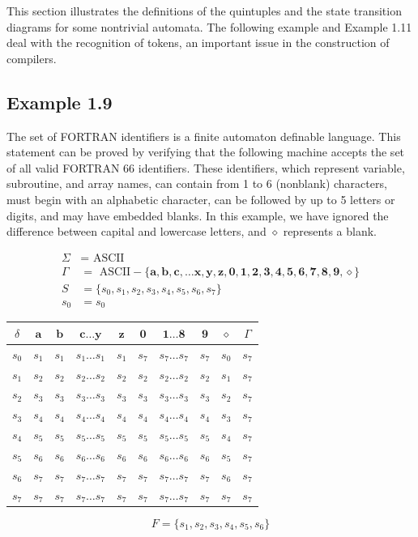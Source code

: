 This section illustrates the definitions of the quintuples and the state
transition diagrams for some nontrivial automata. The following example and
Example 1.11 deal with the recognition of tokens, an important issue in
the construction of compilers.

\subsection*{Example 1.9}

The set of FORTRAN identifiers is a finite automaton definable language. This
statement can be proved by verifying that the following machine accepts the set
of all valid FORTRAN 66 identifiers. These identifiers, which represent
variable, subroutine, and array names, can contain from 1 to 6 (nonblank)
characters, must begin with an alphabetic character, can be followed by up to 5
letters or digits, and may have embedded blanks. In this example, we have
ignored the difference between capital and lowercase letters,
and $\diamond$ represents a blank.

\begin{align*}
\Sigma &=\text{ ASCII} \\
\Gamma &=\text{ ASCII} - \{\pmb{a},\pmb{b},\pmb{c,}\ldots\pmb{x},\pmb{y},\pmb{z},
	\pmb{0},\pmb{1},\pmb{2},\pmb{3},\pmb{4},\pmb{5},\pmb{6},\pmb{7},\pmb{8},
	\pmb{9},\diamond\} \\
S &= \{s_0,s_1,s_2,s_3,s_4,s_5,s_6,s_7\} \\
s_0 &= s_0
\end{align*}

\begin{center}
\begin{tabular}{c|ccccccccc}
$\delta$ & $\pmb{a}$ & $\pmb{b}$ & $\pmb{c}\ldots\pmb{y}$ & $\pmb{z}$ & $\pmb{0}$
	& $\pmb{1}\ldots\pmb{8}$ & $\pmb{9}$ & $\diamond$ & $\Gamma$ \\
\hline
$s_0$ & $s_1$ & $s_1$ & $s_1\ldots s_1$ & $s_1$ & $s_7$ & $s_7\ldots s_7$
	& $s_7$ & $s_0$ & $s_7$ \\
$s_1$ & $s_2$ & $s_2$ & $s_2\ldots s_2$ & $s_2$ & $s_2$ & $s_2\ldots s_2$
	& $s_2$ & $s_1$ & $s_7$ \\ 
$s_2$ & $s_3$ & $s_3$ & $s_3\ldots s_3$ & $s_3$ & $s_3$ & $s_3\ldots s_3$
	& $s_3$ & $s_2$ & $s_7$ \\
$s_3$ & $s_4$ & $s_4$ & $s_4\ldots s_4$ & $s_4$ & $s_4$ & $s_4\ldots s_4$
	& $s_4$ & $s_3$ & $s_7$ \\
$s_4$ & $s_5$ & $s_5$ & $s_5\ldots s_5$ & $s_5$ & $s_5$ & $s_5\ldots s_5$
	& $s_5$ & $s_4$ & $s_7$ \\
$s_5$ & $s_6$ & $s_6$ & $s_6\ldots s_6$ & $s_6$ & $s_6$ & $s_6\ldots s_6$
	& $s_6$ & $s_5$ & $s_7$ \\
$s_6$ & $s_7$ & $s_7$ & $s_7\ldots s_7$ & $s_7$ & $s_7$ & $s_7\ldots s_7$
	& $s_7$ & $s_6$ & $s_7$ \\
$s_7$ & $s_7$ & $s_7$ & $s_7\ldots s_7$ & $s_7$ & $s_7$ & $s_7\ldots s_7$
	& $s_7$ & $s_7$ & $s_7$
\end{tabular}
\[F = \{s_1,s_2,s_3,s_4,s_5,s_6\}\]
\end{center}

